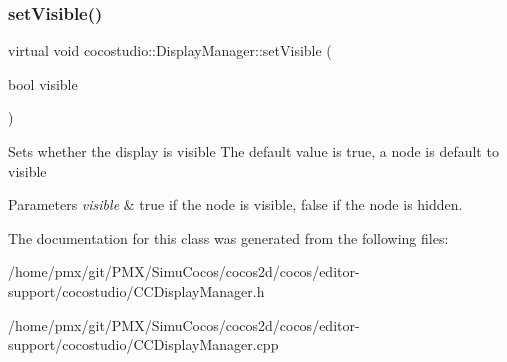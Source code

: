 \subsubsection{\texorpdfstring{set\+Visible()}{setVisible()}\hspace{0.1cm}{\footnotesize\ttfamily [2/2]}}
{\footnotesize\ttfamily virtual void cocostudio\+::\+Display\+Manager\+::set\+Visible (\begin{DoxyParamCaption}\item[{bool}]{visible }\end{DoxyParamCaption})\hspace{0.3cm}{\ttfamily [virtual]}}

Sets whether the display is visible The default value is true, a node is default to visible


\begin{DoxyParams}{Parameters}
{\em visible} & true if the node is visible, false if the node is hidden. \\
\hline
\end{DoxyParams}


The documentation for this class was generated from the following files\+:\begin{DoxyCompactItemize}
\item 
/home/pmx/git/\+P\+M\+X/\+Simu\+Cocos/cocos2d/cocos/editor-\/support/cocostudio/C\+C\+Display\+Manager.\+h\item 
/home/pmx/git/\+P\+M\+X/\+Simu\+Cocos/cocos2d/cocos/editor-\/support/cocostudio/C\+C\+Display\+Manager.\+cpp\end{DoxyCompactItemize}
